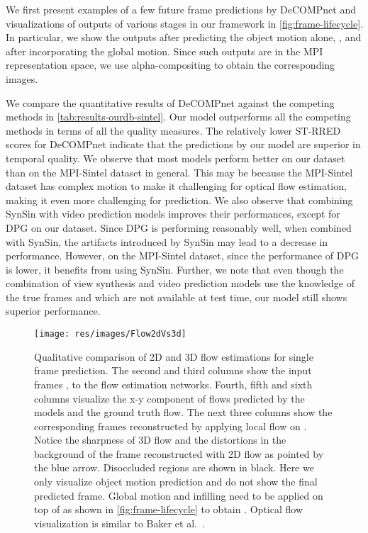 \documentclass[preprint]{vgtc}
\def\etal{et al.}
\begin{document}
    We first present examples of a few future frame predictions by DeCOMPnet and visualizations of outputs of various stages in our framework in \autoref{fig:frame-lifecycle}.
    In particular, we show the outputs after predicting the object motion alone, , and after incorporating the global motion.
    Since such outputs are in the MPI representation space, we use alpha-compositing to obtain the corresponding images.

    We compare the quantitative results of DeCOMPnet against the competing methods in \autoref{tab:results-ourdb-sintel}.
    Our model outperforms all the competing methods in terms of all the quality measures.
    The relatively lower ST-RRED scores for DeCOMPnet indicate that the predictions by our model are superior in temporal quality.
    We observe that most models perform better on our dataset than on the MPI-Sintel dataset in general.
    This may be because the MPI-Sintel dataset has complex motion to make it challenging for optical flow estimation, making it even more challenging for prediction.
    We also observe that combining SynSin with video prediction models improves their performances, except for DPG on our dataset.
    Since DPG is performing reasonably well, when combined with SynSin, the artifacts introduced by SynSin may lead to a decrease in performance.
    However, on the MPI-Sintel dataset, since the performance of DPG is lower, it benefits from using SynSin.
Further, we note that even though the combination of view synthesis and video prediction models use the knowledge of the true frames  and  which are not available at test time, our model still shows superior performance.

    \begin{figure*}
        \centering
        \texttt{[image: res/images/Flow2dVs3d]}
        \caption{Qualitative comparison of 2D and 3D flow estimations for single frame prediction.
The second and third columns show the input frames ,  to the flow estimation networks. Fourth, fifth and sixth columns visualize the x-y component of flows predicted by the models and the ground truth flow.
        The next three columns show the corresponding frames  reconstructed by applying local flow  on .
        Notice the sharpness of 3D flow and the distortions in the background of the frame reconstructed with 2D flow as pointed by the blue arrow.
        Disoccluded regions are shown in black.
        Here we only visualize object motion prediction and do not show the final predicted frame.
        Global motion and infilling need to be applied on top of  as shown in \autoref{fig:frame-lifecycle} to obtain .
        Optical flow visualization is similar to Baker \etal~\cite{baker2011middlebury}.
}
        \label{fig:flow-2d-vs-3d}
    \end{figure*}
\end{document}
